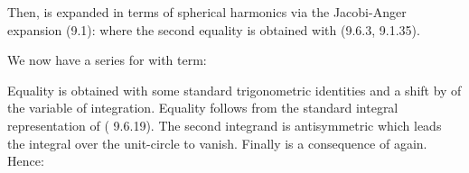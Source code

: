 \documentclass[journal,10pt]{IEEEtran}
\begin{document}
Then,  is expanded in terms of spherical harmonics via the Jacobi-Anger expansion \cite{Abramowitz1964}(9.1): 
where the second equality is obtained with  \cite{Abramowitz1964}(9.6.3, 9.1.35).

We now have a series for  with  term:

Equality  is obtained with some standard trigonometric identities and a shift by  of the variable of integration. Equality  follows from the standard integral representation of  (\cite{Abramowitz1964} 9.6.19). The second integrand is antisymmetric which leads the integral over the unit-circle to vanish. Finally  is a consequence of  again.
Hence:
 
 








\ifCLASSOPTIONcaptionsoff
  \newpage
\fi









\end{document}
